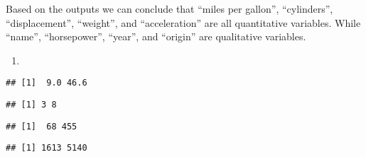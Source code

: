 \documentclass[
]{article}
\newenvironment{Shaded}{\begin{snugshade}}{\end{snugshade}}
\newcommand{\FunctionTok}[1]{\textcolor[rgb]{0.13,0.29,0.53}{\textbf{#1}}}
\newcommand{\NormalTok}[1]{#1}
\newcommand{\SpecialCharTok}[1]{\textcolor[rgb]{0.81,0.36,0.00}{\textbf{#1}}}
\providecommand{\tightlist}{%
  \setlength{\itemsep}{0pt}\setlength{\parskip}{0pt}}
\begin{document}
Based on the outputs we can conclude that ``miles per gallon'',
``cylinders'', ``displacement'', ``weight'', and ``acceleration'' are
all quantitative variables. While ``name'', ``horsepower'', ``year'',
and ``origin'' are qualitative variables.

\begin{enumerate}
\def\labelenumi{(\alph{enumi})}
\setcounter{enumi}{1}
\tightlist
\item
\end{enumerate}

\begin{Shaded}
\end{Shaded}

\begin{verbatim}
## [1]  9.0 46.6
\end{verbatim}

\begin{Shaded}
\end{Shaded}

\begin{verbatim}
## [1] 3 8
\end{verbatim}

\begin{Shaded}
\end{Shaded}

\begin{verbatim}
## [1]  68 455
\end{verbatim}

\begin{Shaded}
\end{Shaded}

\begin{verbatim}
## [1] 1613 5140
\end{verbatim}
\end{document}

